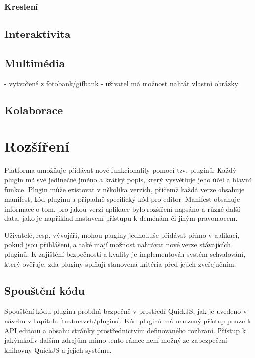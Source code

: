 \subsubsection{Kreslení}

\subsection{Interaktivita}

\subsection{Multimédia}

- vytvořené z fotobank/gifbank
- uživatel má možnost nahrát vlastní obrázky

\subsection{Kolaborace}

\section{Rozšíření}

Platforma umožňuje přidávat nové funkcionality pomocí tzv. pluginů. 
Každý plugin má své jedinečné jméno a krátký popis, který vysvětluje jeho účel a hlavní funkce. 
Plugin může existovat v několika verzích, přičemž každá verze obsahuje manifest, kód pluginu a případně specifický kód pro editor.
Manifest obsahuje informace o tom, pro jakou verzi aplikace bylo rozšíření napsáno a různé další data, jako je například nastavení přístupu k doménám či jiným pravomocem.

Uživatelé, resp. vývojáři, mohou pluginy jednoduše přidávat přímo v aplikaci, pokud jsou přihlášeni, a také mají možnost nahrávat nové verze stávajících pluginů. 
K zajištění bezpečnosti a kvality je implementován systém schvalování, který ověřuje, zda pluginy splňují stanovená kritéria před jejich zveřejněním.

\subsection{Spouštění kódu}

Spouštění kódu pluginů probíhá bezpečně v prostředí QuickJS, jak je uvedeno v návrhu v kapitole \ref{text:navrh/plugins}. 
Kód pluginů má omezený přístup pouze k API editoru a obsahu stránky prostřednictvím definovaného rozhraní. 
Přístup k jakýmkoliv dalším zdrojům mimo tento rámec není možný ze zabezpečení knihovny QuickJS a jejich systému.

